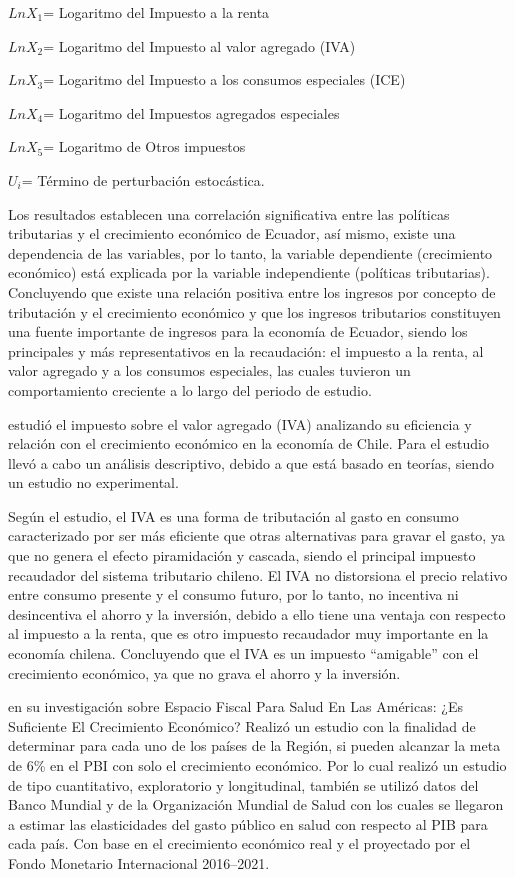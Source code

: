 \documentclass[
  letterpaper,
]{article}
\begin{document}
\(LnX_1\)= Logaritmo del Impuesto a la renta

\(LnX_2\)= Logaritmo del Impuesto al valor agregado (IVA)

\(LnX_3\)= Logaritmo del Impuesto a los consumos especiales (ICE)

\(LnX_4\)= Logaritmo del Impuestos agregados especiales

\(LnX_5\)= Logaritmo de Otros impuestos

\(U_i\)= Término de perturbación estocástica.

Los resultados establecen una correlación significativa entre las
políticas tributarias y el crecimiento económico de Ecuador, así mismo,
existe una dependencia de las variables, por lo tanto, la variable
dependiente (crecimiento económico) está explicada por la variable
independiente (políticas tributarias). Concluyendo que existe una
relación positiva entre los ingresos por concepto de tributación y el
crecimiento económico y que los ingresos tributarios constituyen una
fuente importante de ingresos para la economía de Ecuador, siendo los
principales y más representativos en la recaudación: el impuesto a la
renta, al valor agregado y a los consumos especiales, las cuales
tuvieron un comportamiento creciente a lo largo del periodo de estudio.

\textcite{henriquez_impuesto_2014} estudió el impuesto sobre el valor
agregado (IVA) analizando su eficiencia y relación con el crecimiento
económico en la economía de Chile. Para el estudio llevó a cabo un
análisis descriptivo, debido a que está basado en teorías, siendo un
estudio no experimental.

Según el estudio, el IVA es una forma de tributación al gasto en consumo
caracterizado por ser más eficiente que otras alternativas para gravar
el gasto, ya que no genera el efecto piramidación y cascada, siendo el
principal impuesto recaudador del sistema tributario chileno. El IVA no
distorsiona el precio relativo entre consumo presente y el consumo
futuro, por lo tanto, no incentiva ni desincentiva el ahorro y la
inversión, debido a ello tiene una ventaja con respecto al impuesto a la
renta, que es otro impuesto recaudador muy importante en la economía
chilena. Concluyendo que el IVA es un impuesto ``amigable'' con el
crecimiento económico, ya que no grava el ahorro y la inversión.

\textcite{cid_pedraza_espacio_2018} en su investigación sobre Espacio
Fiscal Para Salud En Las Américas: ¿Es Suficiente El Crecimiento
Económico? Realizó un estudio con la finalidad de determinar para cada
uno de los países de la Región, si pueden alcanzar la meta de 6\% en el
PBI con solo el crecimiento económico. Por lo cual realizó un estudio de
tipo cuantitativo, exploratorio y longitudinal, también se utilizó datos
del Banco Mundial y de la Organización Mundial de Salud con los cuales
se llegaron a estimar las elasticidades del gasto público en salud con
respecto al PIB para cada país. Con base en el crecimiento económico
real y el proyectado por el Fondo Monetario Internacional 2016--2021.
\end{document}
